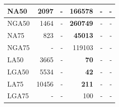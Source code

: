 \documentclass[12pt,a4paper]{article}
\begin{document}
\begin{table}[ht]
\begin{center}
\begin{tabular}{|l*{5}{|r}|}
NA50 & 2097 & - & {\bf 166578} & - & - \\ \hline
NGA50 & 1464 & - & {\bf 260749} & - & - \\ \hline
NA75 & 823 & - & {\bf 45013} & - & - \\ \hline
NGA75 & - & - & 119103 & - & - \\ \hline
LA50 & 3665 & - & {\bf 70} & - & - \\ \hline
LGA50 & 5534 & - & {\bf 42} & - & - \\ \hline
LA75 & 10456 & - & {\bf 211} & - & - \\ \hline
LGA75 & - & - & 100 & - & - \\ \hline
\end{tabular}
\end{center}
\end{table}
\end{document}
